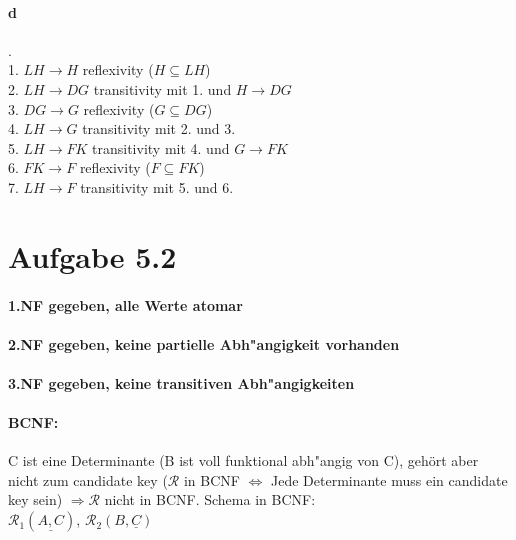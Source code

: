 \documentclass{article}
\begin{document}
		\paragraph*{d}.\\
		1. $ LH \rightarrow H $ \hspace*{40mm}reflexivity ($ H \subseteq LH $)\\
		2. $ LH \rightarrow DG $ \hspace*{37mm}transitivity mit 1. und $ H \rightarrow DG $\\
		3. $ DG \rightarrow G $ \hspace*{40mm}reflexivity ($ G \subseteq DG $)\\
		4. $ LH \rightarrow G $ \hspace*{40mm}transitivity mit 2. und 3.\\
		5. $ LH \rightarrow FK $ \hspace*{37mm}transitivity mit 4. und $ G \rightarrow FK $\\
		6. $ FK \rightarrow F $ \hspace*{40mm}reflexivity ($ F \subseteq FK $)\\
		7. $ LH \rightarrow F $ \hspace*{40mm}transitivity mit 5. und 6.\\
	
	
	\section*{Aufgabe 5.2}
	\paragraph*{1.NF gegeben, alle Werte atomar}
	\paragraph*{2.NF gegeben, keine partielle Abh"angigkeit vorhanden}
	\paragraph*{3.NF gegeben, keine transitiven Abh"angigkeiten}
	\paragraph*{BCNF:}
	C ist eine Determinante (B ist voll funktional abh"angig von C), gehört aber nicht zum candidate key ($ \mathcal{R} $ in BCNF $ \Leftrightarrow $ Jede Determinante muss ein candidate key sein) $ \Rightarrow \mathcal{R} $ nicht in BCNF. Schema in BCNF:\\
	$ \mathcal{R}_1(\underline{A,C}) $, $ \mathcal{R}_2(B,\underline{C}) $
	
\end{document}
